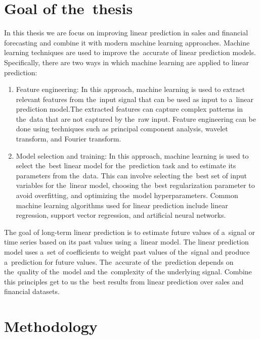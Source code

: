 \chapter{Goal of the~thesis}\label{sec:goal}
In this thesis we are focus on improving linear prediction in sales and financial forecasting and combine it with
modern machine learning approaches. Machine learning techniques are used to improve the~accurate of linear
prediction models. Specifically, there are two ways in which machine learning are applied to linear prediction:
\begin{enumerate}
    \item Feature engineering: In this approach, machine learning is used to extract relevant features from the~input
    signal that can be used as input to a~linear prediction model.The extracted features can capture complex patterns
    in the~data that are not captured by the~raw input. Feature engineering can be done using techniques such as
    principal component analysis, wavelet transform, and Fourier transform.
    \item Model selection and training: In this approach, machine learning is used to select the~best linear
    model for the~prediction task and to estimate its parameters from the~data. This can involve selecting the~best
    set of input variables for the~linear model, choosing the~best regularization parameter to avoid overfitting, and
    optimizing the~model hyperparameters. Common machine learning algorithms used for linear prediction include linear
    regression, support vector regression, and artificial neural networks.
\end{enumerate}
The goal of long-term linear prediction is to estimate future values of a~signal or time series based on its past
values using a~linear model.
The linear prediction model uses a~set of coefficients to weight past values of the~signal and produce a~prediction for
future values. The~accurate of the~prediction depends on the~quality of the~model and the~complexity of the
underlying signal. Combine this principles get to us the~best results from linear prediction over
sales and financial datasets.
\chapter{Methodology}\label{sec:methodology}
